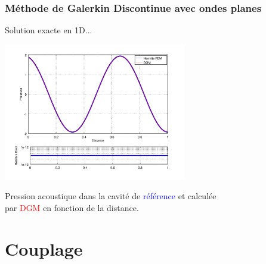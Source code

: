 \documentclass[10pt, compress]{beamer}
\begin{document}
\begin{frame}[fragile]
	\frametitle{Méthode de Galerkin Discontinue avec ondes planes}
    \begin{figure}
        \vspace{-0.1\textwidth}
        \begin{tikzpicture}[>=stealth,scale=0.4,transform shape]
        
        \end{tikzpicture}
        \vspace{-0.2\textwidth}
    \end{figure}

	\begin{block}{Solution exacte en 1D...}
		\begin{center}
		\includegraphics[width=0.6\textwidth]{comp_hermiteFEM_dgm.png}

        \footnotesize{Pression acoustique dans la cavité de \textcolor{blue}{référence} et calculée\\
        par \textcolor{red}{DGM} en fonction de la distance.}
		\end{center}
	\end{block}
\end{frame}

\section{Couplage}
\end{document}
